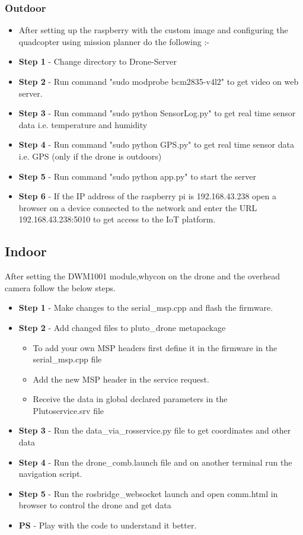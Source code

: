 \documentclass[a4paper,12pt,oneside]{book}
\begin{document}
\subsubsection*{Outdoor}
\begin{itemize}
\item After setting up the raspberry with the custom image and configuring the quadcopter using mission planner do the following :-
\item \textbf{Step 1} - Change directory to Drone-Server
\item \textbf{Step 2} - Run command "sudo modprobe bcm2835-v4l2" to get video on web server.
\item \textbf{Step 3} - Run command "sudo python SensorLog.py" to get real time sensor data i.e. temperature and humidity
\item \textbf{Step 4} - Run command "sudo python GPS.py" to get real time sensor data i.e. GPS (only if the drone is outdoors)
\item \textbf{Step 5} - Run command "sudo python app.py" to start the server
\item \textbf{Step 6} - If the IP address of the raspberry pi is 192.168.43.238 open a browser on a device connected to the network and enter the URL 192.168.43.238:5010 to get access to the IoT platform.

\end{itemize}

\subsection*{Indoor}
After setting the DWM1001 module,whycon on the drone and the overhead camera follow the below steps.
\begin{itemize}
\item \textbf{Step 1} - Make changes to the serial\_msp.cpp and flash the firmware.
\item \textbf{Step 2} - Add changed files to pluto\_drone metapackage
\begin{itemize}
\item To add your own MSP headers first define it in the firmware in the serial\_msp.cpp file
\item Add the new MSP header in the service request.
\item Receive the data in global declared parameters in the \\Plutoservice.srv file
\end{itemize}

\item \textbf{Step 3} - Run the data\_via\_rosservice.py file to get coordinates and other data
\item \textbf{Step 4} - Run the drone\_comb.launch file and on another terminal run the navigation script.
\item \textbf{Step 5} - Run the rosbridge\_websocket launch and open comm.html in browser to control the drone and get data
\item \textbf{PS} - Play with the code to understand it better.
\end{itemize}
\end{document}
